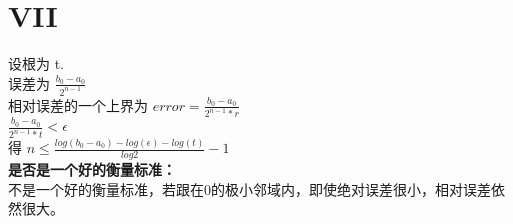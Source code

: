 \documentclass[a4paper]{article}
\begin{document}
  \section*{VII}
  \begin{flushleft}
    设根为 t.\\
    误差为  $\frac{b_0-a_0}{2^{n-1}}$\\
    相对误差的一个上界为  $error=\frac{b_0-a_0}{2^{n-1}*r}$\\
    $\frac{b_0-a_0}{2^{n-1}*t}<\epsilon$\\
    得    $n \leq \frac{log(b_0-a_0)-log(\epsilon)-log(t)}{log 2}-1$\\
    \textbf{是否是一个好的衡量标准：}\\
    不是一个好的衡量标准，若跟在0的极小邻域内，即使绝对误差很小，相对误差依然很大。
  \end{flushleft}
  
\end{document}
